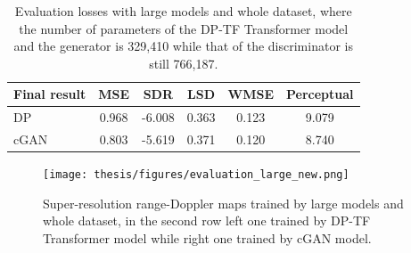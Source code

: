 \begin{table}[!htp]
    \centering
    \caption{Evaluation losses with large models and whole dataset, where the number of parameters of the DP-TF Transformer model and the generator is 329,410 while that of the discriminator is still 766,187.}
    \label{Evaluation losses with large models and whole dataset}
    \begin{tabular}{l|c|c|c|c|c}
        \hline
        Final result & MSE & SDR & LSD & WMSE & Perceptual \\
        \hline
        DP & 0.968 & -6.008 & 0.363 & 0.123 & 9.079 \\
        \hline
        cGAN & 0.803 & -5.619 & 0.371 & 0.120 & 8.740 \\
        \hline
    \end{tabular}
\end{table}

\begin{figure}[!htp]
    \centering
    \texttt{[image: thesis/figures/evaluation\_large\_new.png]}
    \caption{Super-resolution range-Doppler maps trained by large models and whole dataset, in the second row left one trained by DP-TF Transformer model while right one trained by cGAN model.}
    \label{Super-resolution images trained by large models and whole dataset}
\end{figure}
